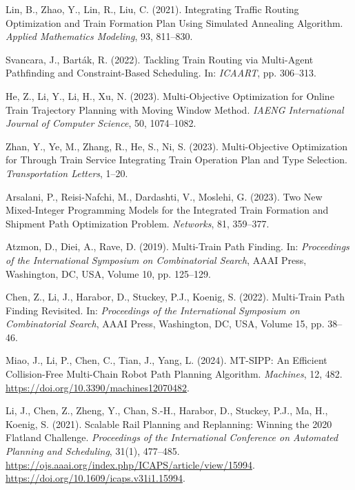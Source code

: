 \begin{thebibliography}{1}
	
	Lin, B., Zhao, Y., Lin, R., Liu, C. (2021). Integrating Traffic Routing Optimization and Train Formation Plan Using Simulated Annealing Algorithm. \textit{Applied Mathematics Modeling}, 93, 811–830.
	
	Svancara, J., Barták, R. (2022). Tackling Train Routing via Multi-Agent Pathfinding and Constraint-Based Scheduling. In: \textit{ICAART}, pp. 306–313.
	
	He, Z., Li, Y., Li, H., Xu, N. (2023). Multi-Objective Optimization for Online Train Trajectory Planning with Moving Window Method. \textit{IAENG International Journal of Computer Science}, 50, 1074–1082.
	
	Zhan, Y., Ye, M., Zhang, R., He, S., Ni, S. (2023). Multi-Objective Optimization for Through Train Service Integrating Train Operation Plan and Type Selection. \textit{Transportation Letters}, 1–20.
	
	Arsalani, P., Reisi-Nafchi, M., Dardashti, V., Moslehi, G. (2023). Two New Mixed-Integer Programming Models for the Integrated Train Formation and Shipment Path Optimization Problem. \textit{Networks}, 81, 359–377.
	
	Atzmon, D., Diei, A., Rave, D. (2019). Multi-Train Path Finding. In: \textit{Proceedings of the International Symposium on Combinatorial Search}, AAAI Press, Washington, DC, USA, Volume 10, pp. 125–129.
	
	Chen, Z., Li, J., Harabor, D., Stuckey, P.J., Koenig, S. (2022). Multi-Train Path Finding Revisited. In: \textit{Proceedings of the International Symposium on Combinatorial Search}, AAAI Press, Washington, DC, USA, Volume 15, pp. 38–46.
	
	Miao, J., Li, P., Chen, C., Tian, J., Yang, L. (2024). MT-SIPP: An Efficient Collision-Free Multi-Chain Robot Path Planning Algorithm. \textit{Machines}, 12, 482. \url{https://doi.org/10.3390/machines12070482}.
	
	
	Li, J., Chen, Z., Zheng, Y., Chan, S.-H., Harabor, D., Stuckey, P.J., Ma, H., Koenig, S. (2021). Scalable Rail Planning and Replanning: Winning the 2020 Flatland Challenge. \textit{Proceedings of the International Conference on Automated Planning and Scheduling}, 31(1), 477–485. \url{https://ojs.aaai.org/index.php/ICAPS/article/view/15994}. \url{https://doi.org/10.1609/icaps.v31i1.15994}.
	
	
	

\end{thebibliography}
